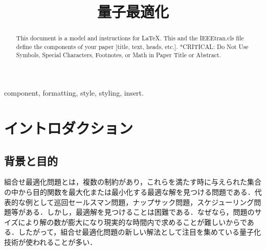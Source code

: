 \documentclass[conference]{IEEEtran}
\begin{document}
\title{量子最適化}

\author{
\and
{}
\and
{}
}

\maketitle

\begin{abstract}
This document is a model and instructions for \LaTeX.
This and the IEEEtran.cls file define the components of your paper [title, text, heads, etc.]. *CRITICAL: Do Not Use Symbols, Special Characters, Footnotes, 
or Math in Paper Title or Abstract.
\end{abstract}

\begin{IEEEkeywords}
component, formatting, style, styling, insert.
\end{IEEEkeywords}

\section{イントロダクション}
\subsection{背景と目的}
組合せ最適化問題とは，複数の制約があり，これらを満たす時に与えられた集合の中から目的関数を最大化または最小化する最適な解を見つける問題である．代表的な例として巡回セールスマン問題，ナップサック問題，スケジューリング問題等がある．しかし，最適解を見つけることは困難である．なぜなら，問題のサイズにより解の数が膨大になり現実的な時間内で求めることが難しいからである．したがって，組合せ最適化問題の新しい解法として注目を集めている量子化技術が使われることが多い．
\end{document}
